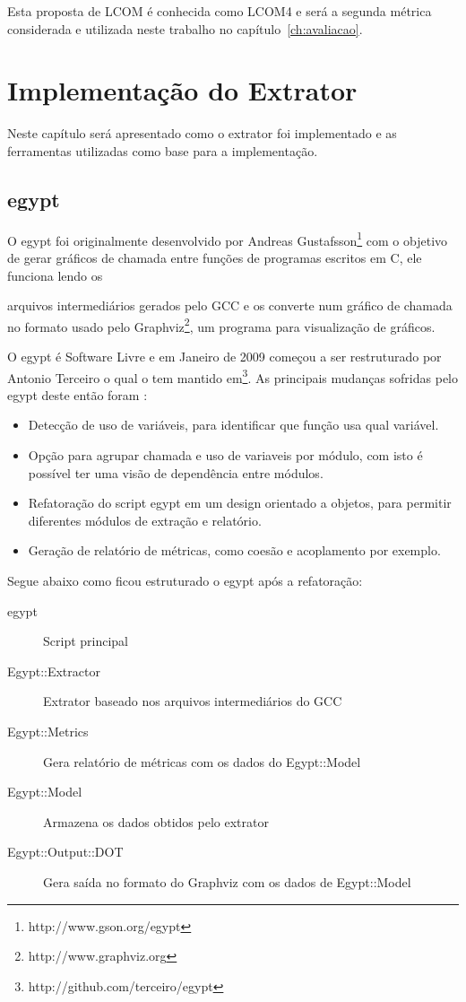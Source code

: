 Esta proposta de LCOM é conhecida como LCOM4 e será a segunda métrica considerada
e utilizada neste trabalho no capítulo~\ref{ch:avaliacao}.


\chapter{Implementação do Extrator} \label{ch:implementacao}

Neste capítulo será apresentado como o extrator foi implementado e as
ferramentas utilizadas como base para a implementação.

\section{egypt} \label{sec:egypt}

O egypt foi originalmente desenvolvido por Andreas
Gustafsson\footnote{http://www.gson.org/egypt} com o objetivo de gerar gráficos
de chamada entre funções de programas escritos em C, ele funciona lendo os

arquivos intermediários gerados pelo GCC e os converte num gráfico de chamada
no formato usado pelo Graphviz\footnote{http://www.graphviz.org}, um programa
para visualização de gráficos.

O egypt é Software Livre e em Janeiro de 2009 começou a ser restruturado por
Antonio Terceiro o qual o tem mantido
em\footnote{http://github.com/terceiro/egypt}. As principais mudanças sofridas
pelo egypt deste então foram \cite{structuralComplexityEvolution}:

\begin{itemize}
\item Detecção de uso de variáveis, para identificar que função usa qual
variável.
\item Opção para agrupar chamada e uso de variaveis por módulo, com isto é
possível ter uma visão de dependência entre módulos.
\item Refatoração do script egypt em um design orientado a objetos, para
permitir diferentes módulos de extração e relatório.
\item Geração de relatório de métricas, como coesão e acoplamento por exemplo.
\end{itemize}

Segue abaixo como ficou estruturado o egypt após a refatoração:

\begin{description}
\item[egypt] Script principal
\item[Egypt::Extractor] Extrator baseado nos arquivos intermediários do GCC
\item[Egypt::Metrics] Gera relatório de métricas com os dados do Egypt::Model
\item[Egypt::Model] Armazena os dados obtidos pelo extrator
\item[Egypt::Output::DOT] Gera saída no formato do Graphviz com os dados de Egypt::Model
\end{description}

